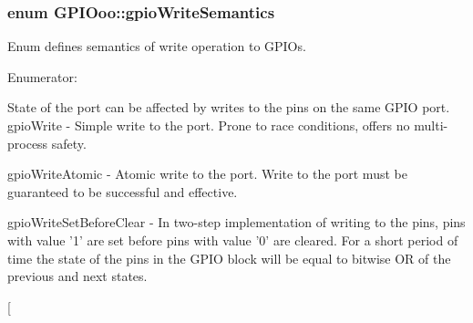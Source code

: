 \hypertarget{class_g_p_i_ooo_ad4b133662b68989435bcd422feb0fc03}{
\subsubsection[{gpio\-Write\-Semantics}]{\setlength{\rightskip}{0pt plus 5cm}enum {\bf G\-P\-I\-Ooo\-::gpio\-Write\-Semantics}}}\label{class_g_p_i_ooo_ad4b133662b68989435bcd422feb0fc03}
Enum defines semantics of write operation to G\-P\-I\-Os. \begin{Desc}
\item[Enumerator\-: ]\par
\begin{description}
\item[{\em 
\hypertarget{class_g_p_i_ooo_ad4b133662b68989435bcd422feb0fc03a21aadd48a3896150795cd7fde8c93969}{gpio\-Write}\label{class_g_p_i_ooo_ad4b133662b68989435bcd422feb0fc03a21aadd48a3896150795cd7fde8c93969}
}]State of the port can be affected by writes to the pins on the same G\-P\-I\-O port. gpio\-Write -\/ Simple write to the port. Prone to race conditions, offers no multi-\/process safety. \item[{\em 
\hypertarget{class_g_p_i_ooo_ad4b133662b68989435bcd422feb0fc03a359f92e59dfc786c8eb730a95179fd1b}{gpio\-Write\-Atomic}\label{class_g_p_i_ooo_ad4b133662b68989435bcd422feb0fc03a359f92e59dfc786c8eb730a95179fd1b}
}]gpio\-Write\-Atomic -\/ Atomic write to the port. Write to the port must be guaranteed to be successful and effective. \item[{\em 
\hypertarget{class_g_p_i_ooo_ad4b133662b68989435bcd422feb0fc03a551b9df4fca015828bfdfbce0e4e9c31}{gpio\-Write\-Set\-Before\-Clear}\label{class_g_p_i_ooo_ad4b133662b68989435bcd422feb0fc03a551b9df4fca015828bfdfbce0e4e9c31}
}]gpio\-Write\-Set\-Before\-Clear -\/ In two-\/step implementation of writing to the pins, pins with value '1' are set before pins with value '0' are cleared. For a short period of time the state of the pins in the G\-P\-I\-O block will be equal to bitwise O\-R of the previous and next states. \item[{\em 
}
\end{description}
\end{Desc}
